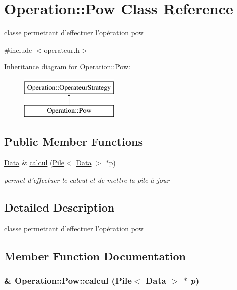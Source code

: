 \hypertarget{classOperation_1_1Pow}{
\section{Operation::Pow Class Reference}
\label{classOperation_1_1Pow}
}


classe permettant d'effectuer l'opération pow  




{\ttfamily \#include $<$operateur.h$>$}

Inheritance diagram for Operation::Pow:\begin{figure}[H]
\begin{center}
\leavevmode
\includegraphics[height=2cm]{classOperation_1_1Pow}
\end{center}
\end{figure}
\subsection*{Public Member Functions}
\begin{DoxyCompactItemize}
\item 
\hyperlink{classNombre_1_1Data}{Data} \& \hyperlink{classOperation_1_1Pow_a11a1d7683969a9b487debfaeecd065c4}{calcul} (\hyperlink{classPile}{Pile}$<$ \hyperlink{classNombre_1_1Data}{Data} $>$ $\ast$p)
\begin{DoxyCompactList}\small\item\em permet d'effectuer le calcul et de mettre la pile à jour \item\end{DoxyCompactList}\end{DoxyCompactItemize}


\subsection{Detailed Description}
classe permettant d'effectuer l'opération pow 

\subsection{Member Function Documentation}
\hypertarget{classOperation_1_1Pow_a11a1d7683969a9b487debfaeecd065c4}{
\subsubsection[{calcul}]{\& Operation::Pow::calcul ({\bf Pile}$<$ {\bf Data} $>$ $\ast$ {\em p})}}
\label{classOperation_1_1Pow_a11a1d7683969a9b487debfaeecd065c4}


